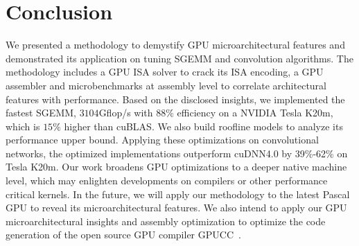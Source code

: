 \section{Conclusion}
\label{sec:conclusion}
We presented a methodology to demystify GPU microarchitectural features and demonstrated its 
application on tuning SGEMM and convolution algorithms. 
The methodology includes a GPU ISA solver to crack its ISA encoding, a GPU
assembler and microbenchmarks at assembly level to correlate architectural
features with performance.
Based on the disclosed insights, we implemented the
fastest SGEMM,  $3104$Gflop/s with $88\%$ efficiency on a NVIDIA Tesla K20m, which is $15\%$ higher than cuBLAS. 
We also build roofline models to analyze its performance upper bound. 
Applying these optimizations on convolutional networks, the optimized implementations outperform cuDNN4.0 by 39\%-62\% on Tesla K20m.
Our work broadens GPU optimizations to a deeper native machine level,
which may enlighten developments on
compilers or other performance critical kernels.
In the future, we will apply our methodology to the latest Pascal GPU to reveal its microarchitectural features.
We also intend to apply our GPU microarchitectural insights and assembly
optimization to optimize the code generation of the open source GPU compiler
GPUCC~\cite{wu2016gpucc}.
